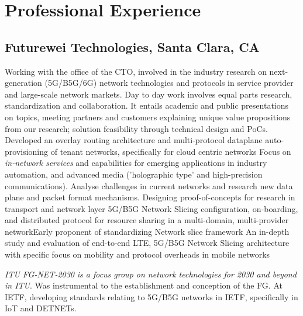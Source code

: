 \documentclass[11pt,a4paper,sans]{moderncv} %
\begin{document}
\section{Professional Experience}
\subsection{Futurewei Technologies, Santa Clara, CA}
{Working with the office of the CTO, involved in the industry research on next-generation (5G/B5G/6G) network technologies and protocols in service provider and large-scale network markets. Day to day work involves equal parts research, standardization and collaboration. It entails academic and public presentations on topics, meeting partners and customers explaining unique value propositions from our research; solution feasibility through technical design and PoCs.\\
}
{Developed an overlay routing architecture and multi-protocol dataplane auto-provisioning of tenant networks, specifically for cloud centric networks}{}
{Focus on \textit{in-network services} and capabilities for emerging applications in industry automation, and advanced media ('holographic type' and high-precision communications). Analyse challenges in current networks and research new data plane and packet format mechanisms. Designing proof-of-concepts for research in transport and network layer}{}
{5G/B5G Network Slicing configuration, on-boarding, and  distributed protocol for resource sharing in a multi-domain, multi-provider network}{Early proponent of standardizing Network slice framework} {}
{An in-depth study and evaluation of end-to-end LTE, 5G/B5G Network Slicing architecture with specific focus on mobility and protocol overheads in mobile networks} {}

 {\textit{ITU FG-NET-2030}}{}{}
 {\emph{is a focus group on network technologies for 2030 and beyond in ITU}. Was instrumental to the establishment and conception of the FG. 
 } {At IETF, developing standards relating to 5G/B5G networks in IETF, specifically in IoT and DETNETs.}
\end{document}
